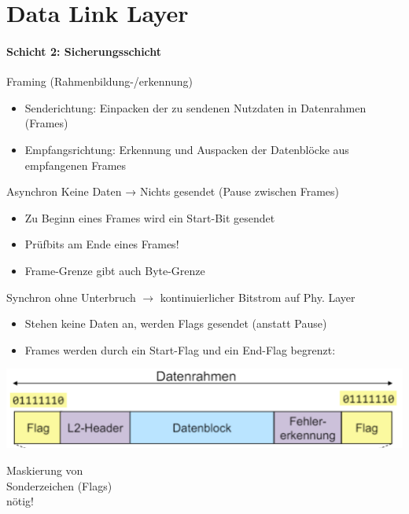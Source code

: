 \section{Data Link Layer}
\paragraph{Schicht 2: Sicherungsschicht}

\begin{definition}{Framing (Rahmenbildung-/erkennung)}
    \begin{itemize}
        \item Senderichtung: Einpacken der zu sendenen Nutzdaten in Datenrahmen (Frames)
        \item Empfangsrichtung: Erkennung und Auspacken der Datenblöcke aus empfangenen Frames
    \end{itemize}
\end{definition}

\begin{concept}{Asynchron}
    {\small Keine Daten → Nichts gesendet (Pause zwischen Frames)}
    \begin{itemize}
        \item Zu Beginn eines Frames wird ein Start-Bit gesendet
        \item Prüfbits am Ende eines Frames!
        \item Frame-Grenze gibt auch Byte-Grenze
    \end{itemize}
\end{concept}

\begin{concept}{Synchron}
    {\small ohne Unterbruch $\rightarrow$ kontinuierlicher Bitstrom auf Phy. Layer}
    \begin{itemize}
        \item Stehen keine Daten an, werden Flags gesendet (anstatt Pause)
        \item Frames werden durch ein Start-Flag und ein End-Flag begrenzt:
    \end{itemize}
    \begin{minipage}{0.6\linewidth}
        \includegraphics[width=1\linewidth]{images/flags_frames.png}
    \end{minipage}
    \begin{minipage}{0.39\linewidth}
        Maskierung von\\ Sonderzeichen (Flags)\\ nötig!
    \end{minipage}
\end{concept}

